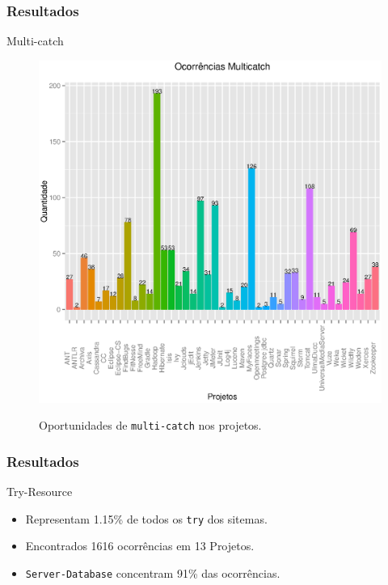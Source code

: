 \documentclass[]{beamer}
\begin{document}
	\begin{frame}[fragile, label=re]\frametitle{Resultados}
		\begin{block}{Multi-catch}
	
			\begin{figure}[h]
				\center
					\includegraphics[scale=0.35]{../TCC/Imagens/ocorrenciasMulticatch}
				\label{fig:muticatch}
				\caption{Oportunidades de \texttt{multi-catch} nos projetos.}
			\end{figure}
		\end{block}
	
	\end{frame}	

	\begin{frame}[fragile, label=re]\frametitle{Resultados}
		\begin{block}{Try-Resource}
			\begin{itemize}
				\item Representam 1.15\% de todos os \texttt{try} dos sitemas.
			
				\item Encontrados 1616 ocorrências em 13 Projetos.
								
				\item \texttt{Server-Database} concentram 91\% das ocorrências.
			
			\end{itemize}
			
		\end{block}
		
	\end{frame}
	
\end{document}
